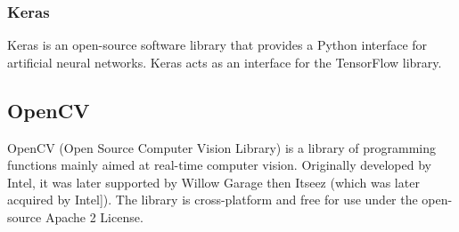     \subsubsection{Keras}
    Keras is an open-source software library that provides a Python interface for artificial neural networks. Keras acts as an interface for the TensorFlow library.
    
    \subsection{OpenCV}
    OpenCV (Open Source Computer Vision Library) is a library of programming functions mainly aimed at real-time computer vision. Originally developed by Intel, 
    it was later supported by Willow Garage then Itseez (which was later acquired by Intel]). The library is cross-platform and free for use under the open-source Apache 2 License. 